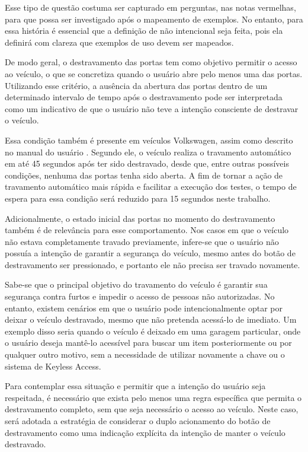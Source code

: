 Esse tipo de questão costuma ser capturado em perguntas, nas notas vermelhas, para que possa ser investigado após o mapeamento de exemplos. No entanto, para essa 
história é essencial que a definição de não intencional seja feita, pois ela definirá com clareza que exemplos de uso devem ser mapeados.

De modo geral, o destravamento das portas tem como objetivo permitir o acesso ao veículo, o que se concretiza quando o usuário abre pelo menos uma das portas. Utilizando 
esse critério, a ausência da abertura das portas dentro de um determinado intervalo de tempo após o destravamento pode ser interpretada como um indicativo de que o 
usuário não teve a intenção consciente de destravar o veículo. 

Essa condição também é presente em veículos Volkswagen, assim como descrito no manual do usuário \cite{vwLocking}. Segundo ele, o veículo realiza o travamento automático 
em até 45 segundos após ter sido destravado, desde que, entre outras possíveis condições, nenhuma das portas tenha sido aberta. A fim de tornar a ação de travamento 
automático mais rápida e facilitar a execução dos testes, o tempo de espera para essa condição será reduzido para 15 segundos neste trabalho.

Adicionalmente, o estado inicial das portas no momento do destravamento também é de relevância para esse comportamento. Nos casos em que o veículo não estava 
completamente travado previamente, infere-se que o usuário não possuía a intenção de garantir a segurança do veículo, mesmo antes do botão de destravamento ser 
pressionado, e portanto ele não precisa ser travado novamente.

Sabe-se que o principal objetivo do travamento do veículo é garantir sua segurança contra furtos e impedir o acesso de pessoas não autorizadas. No entanto, existem 
cenários em que o usuário pode intencionalmente optar por deixar o veículo destravado, mesmo que não pretenda acessá-lo de imediato. Um exemplo disso seria quando 
o veículo é deixado em uma garagem particular, onde o usuário deseja mantê-lo acessível para buscar um item posteriormente ou por qualquer outro motivo, sem a 
necessidade de utilizar novamente a chave ou o sistema de Keyless Access.

Para contemplar essa situação e permitir que a intenção do usuário seja respeitada, é necessário que exista pelo menos uma regra específica que permita o 
destravamento completo, sem que seja necessário o acesso ao veículo. Neste caso, será adotada a estratégia de considerar o duplo acionamento do botão de 
destravamento como uma indicação explícita da intenção de manter o veículo destravado.

